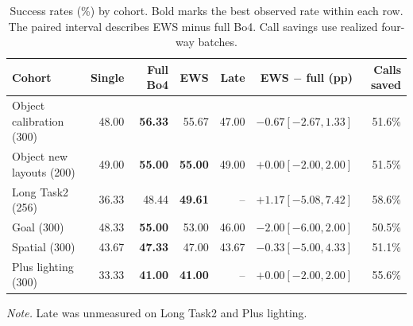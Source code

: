 \begin{table}[t]\centering\small\setlength{\tabcolsep}{3.1pt}
\caption{Success rates (\%) by cohort. Bold marks the best observed rate within each row. The paired interval describes EWS minus full Bo4. Call savings use realized four-way batches.}
\label{tab:cohorts}
\begin{tabular}{@{}lrrrrrr@{}}\toprule
Cohort & Single & Full Bo4 & EWS & Late & EWS $-$ full (pp) & Calls saved \\
\midrule
Object calibration (300) & 48.00 & \textbf{56.33} & 55.67 & 47.00 & $-0.67 [-2.67, 1.33]$ & 51.6\% \\
Object new layouts (200) & 49.00 & \textbf{55.00} & \textbf{55.00} & 49.00 & $+0.00 [-2.00, 2.00]$ & 51.5\% \\
Long Task2 (256) & 36.33 & 48.44 & \textbf{49.61} & -- & $+1.17 [-5.08, 7.42]$ & 58.6\% \\
Goal (300) & 48.33 & \textbf{55.00} & 53.00 & 46.00 & $-2.00 [-6.00, 2.00]$ & 50.5\% \\
Spatial (300) & 43.67 & \textbf{47.33} & 47.00 & 43.67 & $-0.33 [-5.00, 4.33]$ & 51.1\% \\
Plus lighting (300) & 33.33 & \textbf{41.00} & \textbf{41.00} & -- & $+0.00 [-2.00, 2.00]$ & 55.6\% \\
\bottomrule\end{tabular}
\par\smallskip\footnotesize\textit{Note.} Late was unmeasured on Long Task2 and Plus lighting.
\end{table}

